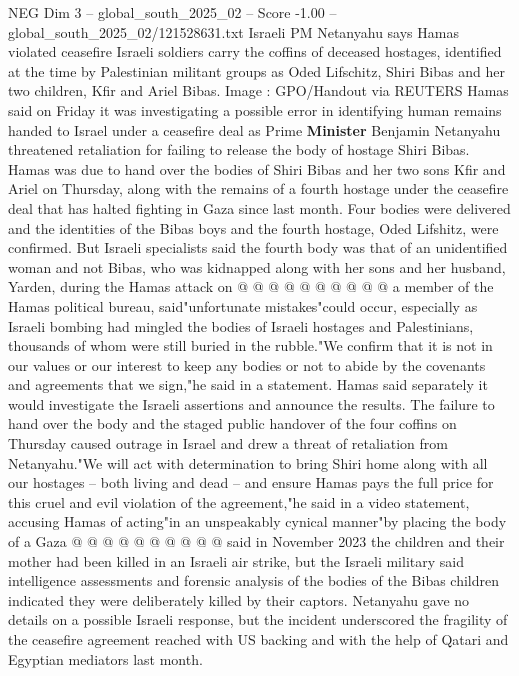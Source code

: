 \begin{textsample}{NEG Dim 3 – global\_south\_2025\_02 – Score -1.00 – global\_south\_2025\_02/121528631.txt}  \label{ex:f3_neg_010}
Israeli PM Netanyahu says Hamas violated ceasefire Israeli soldiers carry the coffins of deceased hostages, identified at the time by Palestinian militant groups as Oded Lifschitz, Shiri Bibas and her two children, Kfir and Ariel Bibas.
Image : GPO/Handout via REUTERS Hamas said on Friday it was investigating a possible error in identifying human remains handed to Israel under a ceasefire deal as Prime \textbf{Minister} Benjamin Netanyahu threatened retaliation for failing to release the body of hostage Shiri Bibas.
Hamas was due to hand over the bodies of Shiri Bibas and her two sons Kfir and Ariel on Thursday, along with the remains of a fourth hostage under the ceasefire deal that has halted fighting in Gaza since last month.
Four bodies were delivered and the identities of the Bibas boys and the fourth hostage, Oded Lifshitz, were confirmed.
But Israeli specialists said the fourth body was that of an unidentified woman and not Bibas, who was kidnapped along with her sons and her husband, Yarden, during the Hamas attack on @ @ @ @ @ @ @ @ @ @ a member of the Hamas political bureau, said"unfortunate mistakes"could occur, especially as Israeli bombing had mingled the bodies of Israeli hostages and Palestinians, thousands of whom were still buried in the rubble."We confirm that it is not in our values or our interest to keep any bodies or not to abide by the covenants and agreements that we sign,"he said in a statement.
Hamas said separately it would investigate the Israeli assertions and announce the results.
The failure to hand over the body and the staged public handover of the four coffins on Thursday caused outrage in Israel and drew a threat of retaliation from Netanyahu."We will act with determination to bring Shiri home along with all our hostages -- both living and dead -- and ensure Hamas pays the full price for this cruel and evil violation of the agreement,"he said in a video statement, accusing Hamas of acting"in an unspeakably cynical manner"by placing the body of a Gaza @ @ @ @ @ @ @ @ @ @ said in November 2023 the children and their mother had been killed in an Israeli air strike, but the Israeli military said intelligence assessments and forensic analysis of the bodies of the Bibas children indicated they were deliberately killed by their captors.
Netanyahu gave no details on a possible Israeli response, but the incident underscored the fragility of the ceasefire agreement reached with US backing and with the help of Qatari and Egyptian mediators last month.

\end{textsample}
